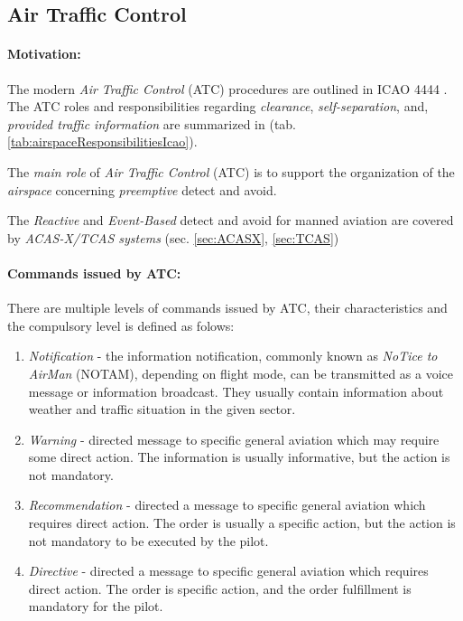 \subsection{Air Traffic Control}\label{sec:AirTrafficControl}
\paragraph{Motivation:} The modern \emph{Air Traffic Control} (ATC) procedures are outlined in ICAO 4444 \cite{icao4444}. The ATC roles and responsibilities regarding \emph{clearance}, \emph{self-separation}, and, \emph{provided traffic information} are summarized in (tab. \ref{tab:airspaceResponsibilitiesIcao}). 

The \emph{main role} of \emph{Air Traffic Control} (ATC) is to support the organization of the \emph{airspace} concerning \emph{preemptive} detect and avoid.

\begin{note}
    The \emph{Reactive} and \emph{Event-Based} detect and avoid for manned aviation are covered by \emph{ACAS-X/TCAS systems} (sec. \ref{sec:ACASX}, \ref{sec:TCAS})
\end{note}

\paragraph{Commands issued by ATC:} There are multiple levels of commands issued by ATC, their characteristics and the compulsory level is defined as folows:

\begin{enumerate}
    \item \emph{Notification} - the information notification, commonly known as \emph{NoTice to AirMan} (NOTAM), depending on flight mode, can be transmitted as a voice message or information broadcast. They usually contain information about weather and traffic situation in the given sector.
    
    \item \emph{Warning} - directed message to specific general aviation  which may require some direct action. The information is usually informative, but the action is not mandatory.
    
    \item \emph{Recommendation} - directed a message to specific general aviation  which requires direct action. The order is usually a specific action, but the action is not mandatory to be executed by the pilot.
    
    \item \emph{Directive} - directed a message to specific general aviation  which requires direct action. The order is specific action, and the order fulfillment is mandatory for the pilot. 
\end{enumerate}

